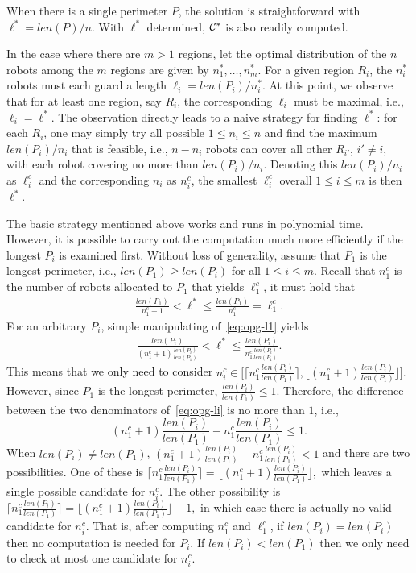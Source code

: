 When there is a single perimeter $P$, the solution is straightforward 
with $\ell^* = len(P)/n$. With $\ell^*$ determined, $\mathcal C^*$ is also readily computed. 

In the case where there are $m > 1$ regions, let the optimal 
distribution of the $n$ robots among the $m$ regions are given by 
$n_1^*, \ldots, n_m^*$. For a given region $R_i$, the $n_i^*$ robots 
must each guard a length $\ell_i = len(P_i)/n_i^*$. At this point, we
observe that for at least one region, say $R_i$, 
the corresponding $\ell_i$ must be maximal, i.e., $\ell_i = \ell^*$. 
The observation directly leads to a naive strategy for finding $\ell^*$: 
for each $R_i$, one may simply try all possible $1 \le n_i \le n$ and 
find the maximum $len(P_i)/n_i$ that is feasible, i.e., $n - n_i$ robots
can cover all other $R_{i'}$, $i' \ne i$, with each robot covering no 
more than $len(P_i)/n_i$. Denoting this $len(P_i)/n_i$ as $\ell_i^c$ and 
the corresponding $n_i$ as $n_i^c$, the smallest $\ell_i^c$ overall $1 
\le i \le m$ is then $\ell^*$.

The basic strategy mentioned above works and runs in polynomial time. 
However, it is possible to carry out the computation much more 
efficiently if the longest $P_i$ is examined first. Without loss of 
generality, assume that $P_1$ is the longest perimeter, i.e., $len(P_1)
\ge len(P_{i})$ for all $1 \le i \le m$. Recall that $n_1^c$ is the 
number of robots allocated to $P_1$ that yields $\ell_1^c$, it must hold 
that 
\begin{align}\label{eq:opg-l1}
\frac{len(P_1)}{n_1^c + 1} < \ell^* \le \frac{len(P_1)}{n_1^c} = \ell_1^c .
\end{align}
For an arbitrary $P_i$, simple manipulating of~\eqref{eq:opg-l1} yields
\begin{align}\label{eq:opg-li}
\frac{len(P_i)}{(n_1^c + 1)\frac{len(P_i)}{len(P_1)}} < \ell^* \le 
\frac{len(P_i)}{n_1^c\frac{len(P_i)}{len(P_1)}}.
\end{align}
This means that we only need to consider
$
n_i^c \in 
\big[\lceil n_1^c\frac{len(P_i)}{len(P_1)} \rceil, 
\lfloor (n_1^c + 1)\frac{len(P_i)}{len(P_1)}\rfloor].
$
However, since $P_1$ is the longest perimeter, $\frac{len(P_i)}{len(P_1)} 
\le 1$. Therefore, the difference between the two denominators 
of~\eqref{eq:opg-li} is no more than $1$, i.e., 
\[
(n_1^c + 1)\frac{len(P_i)}{len(P_1)} - n_1^c\frac{len(P_i)}{len(P_1)} \le 1. 
\]
When $len(P_i) \ne len(P_1)$, $(n_1^c + 1)\frac{len(P_i)}{len(P_1)} 
- n_1^c\frac{len(P_i)}{len(P_1)} < 1$ and there are two possibilities. One 
of these is 
$
\lceil n_1^c\frac{len(P_i)}{len(P_1)} \rceil =
\lfloor (n_1^c + 1)\frac{len(P_i)}{len(P_1)}\rfloor,
$
which leaves a single possible candidate for $n_i^c$. The other 
possibility 
is 
$
\lceil n_1^c\frac{len(P_i)}{len(P_1)} \rceil =
\lfloor (n_1^c + 1)\frac{len(P_i)}{len(P_1)}\rfloor + 1,
$
in which case there is actually no valid candidate for $n_i^c$. 
That is, after computing $n_1^c$ and $\ell_1^c$, if $len(P_i) = len(P_i)$ 
then no computation is needed for $P_i$. If $len(P_i) < len(P_1)$ then we 
only need to check at most one candidate for $n_i^c$. 

